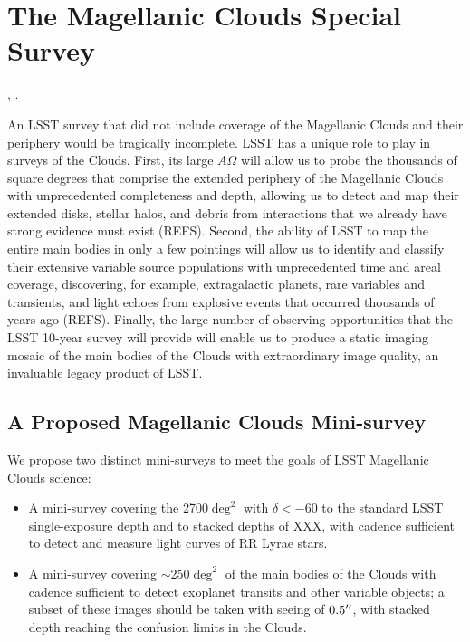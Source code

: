 %
%
%
%
%
%

\section{The Magellanic Clouds Special Survey}
\def\secname{mc}\label{sec:\secname}

,
.


An LSST survey that did not include coverage of the Magellanic Clouds
and their periphery would be tragically incomplete.  LSST has a unique
role to play in surveys of the Clouds.  First, its large $A\Omega$
will allow us to probe the thousands of square degrees that comprise
the extended periphery of the Magellanic Clouds with unprecedented
completeness and depth, allowing us to detect and map their extended
disks, stellar halos, and debris from interactions that we already
have strong evidence must exist (REFS).  Second, the ability of LSST
to map the entire main bodies in only a few pointings will allow us to
identify and classify their extensive variable source populations with
unprecedented time and areal coverage, discovering, for example,
extragalactic planets, rare variables and transients, and light echoes
from explosive events that occurred thousands of years ago (REFS).
Finally, the large number of observing opportunities that the LSST
10-year survey will provide will enable us to produce a static imaging
mosaic of the main bodies of the Clouds with extraordinary image
quality, an invaluable legacy product of LSST.


\subsection{A Proposed Magellanic Clouds Mini-survey}
\label{sec:\secname:proposal}

We propose two distinct mini-surveys to meet the goals of LSST
Magellanic Clouds science:
\begin{itemize}
\item A mini-survey covering the 2700$\deg^2$ with $\delta < -60$ to
the standard LSST single-exposure depth and to stacked depths of XXX,
with cadence sufficient to detect and measure light curves of RR Lyrae
stars.
\item A mini-survey covering $\sim$250$\deg^2$ of the main bodies of
the Clouds with cadence sufficient to detect exoplanet transits and
other variable objects; a subset of these images should be taken with
seeing of $0.5''$, with stacked depth reaching the confusion
limits in the Clouds.
\end{itemize}

